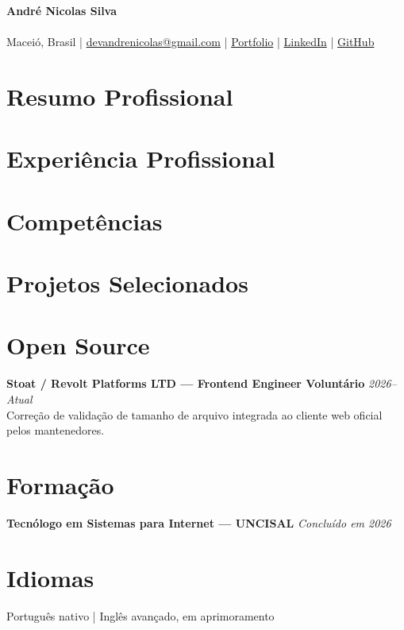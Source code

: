 
\begin{center}
  {\LARGE\textbf{André Nicolas Silva}}\\[0.2em]
  \CvTitle\\[0.25em]
  Maceió, Brasil | \href{mailto:devandrenicolas@gmail.com}{devandrenicolas@gmail.com} | \href{https://portfolio-andrenicolas.vercel.app}{Portfolio} | \href{https://www.linkedin.com/in/devandrenicolas}{LinkedIn} | \href{https://github.com/devAndreNicolas}{GitHub}
\end{center}
\section*{Resumo Profissional}
\CvSummary
\section*{Experiência Profissional}
\CvExperience
\section*{Competências}
\CvSkills
\section*{Projetos Selecionados}
\CvProjects
\section*{Open Source}
\textbf{Stoat / Revolt Platforms LTD — Frontend Engineer Voluntário} \hfill \textit{2026--Atual}\\
Correção de validação de tamanho de arquivo integrada ao cliente web oficial pelos mantenedores.
\section*{Formação}
\textbf{Tecnólogo em Sistemas para Internet — UNCISAL} \hfill \textit{Concluído em 2026}
\section*{Idiomas}
Português nativo | Inglês avançado, em aprimoramento

